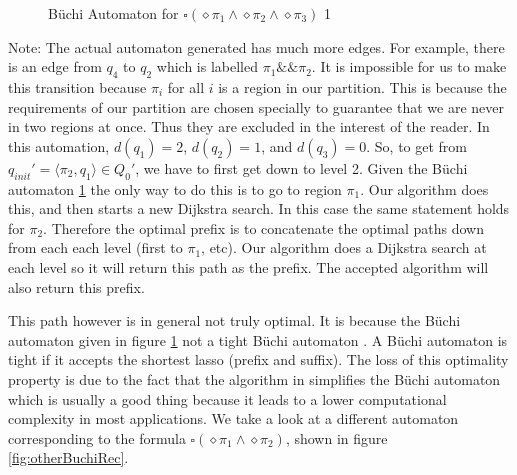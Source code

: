 \begin{figure}
\centering
{}
\caption{B\"uchi Automaton for $\square(\diamond \pi_1 \land \diamond \pi_2 \land \diamond \pi_3)$ 1}
\label{fig:gasBuchiRec}
\end{figure}
Note: The actual automaton generated has much more edges. For example, there is an edge from $q_4$ to $q_2$ which is labelled $\pi_1 \&\& \pi_2$. It is impossible for us to make this transition because $\pi_i$ for all $i$ is a region in our partition. This is because the requirements of our partition are chosen specially to guarantee that we are never in two regions at once. Thus they are excluded in the interest of the reader. In this automation, $d(q_1)=2$, $d(q_2)=1$, and $d(q_3)=0$. So, to get from $q_{init}' = \langle \pi_2, q_1 \rangle \in Q_0'$, we have to first get down to level 2. Given the B\"{u}chi automaton \ref{fig:gasBuchiRec} the only way to do this is to go to region $\pi_1$. Our algorithm does this, and then starts a new Dijkstra search. In this case the same statement holds for $\pi_2$. Therefore the optimal prefix is to concatenate the optimal paths down from each each level (first to $\pi_1$, etc). Our algorithm does a Dijkstra search at each level so it will return this path as the prefix. The accepted algorithm will also return this prefix. 

This path however is in general not truly optimal. It is because the B\"{u}chi automaton given in figure \ref{fig:gasBuchiRec} not a tight B\"{u}chi automaton \cite{schuppan05}. A B\"{u}chi automaton is tight if it accepts the shortest lasso (prefix and suffix). The loss of this optimality property is due to the fact that the algorithm in \cite{gastin01} simplifies the B\"{u}chi automaton which is usually a good thing because it leads to a lower computational complexity in most applications. We take a look at a different automaton corresponding to the formula $\square(\diamond \pi_1 \land \diamond \pi_2)$, shown in figure \ref{fig:otherBuchiRec}. 

